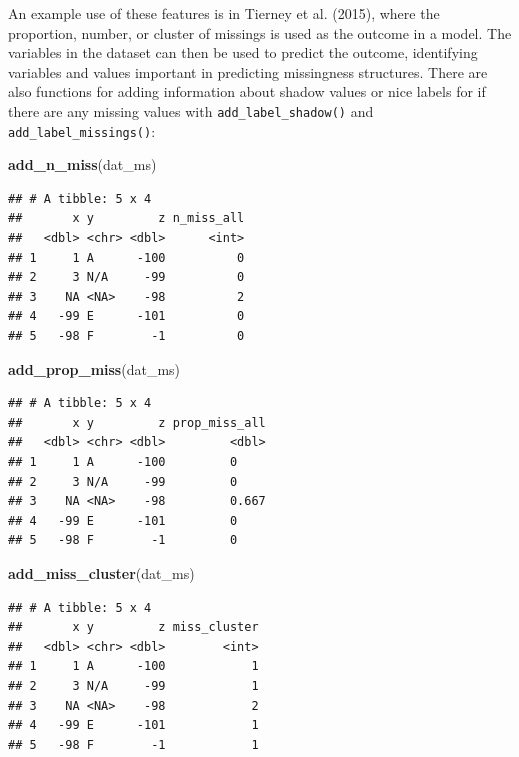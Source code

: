 \documentclass[]{article}
\newenvironment{Shaded}{\begin{snugshade}}{\end{snugshade}}
\newcommand{\KeywordTok}[1]{\textcolor[rgb]{0.13,0.29,0.53}{\textbf{#1}}}
\newcommand{\NormalTok}[1]{#1}
\theoremstyle{definition}
\theoremstyle{definition}
\theoremstyle{definition}
\theoremstyle{remark}
\begin{document}
An example use of these features is in Tierney et al. (2015), where the
proportion, number, or cluster of missings is used as the outcome in a
model. The variables in the dataset can then be used to predict the
outcome, identifying variables and values important in predicting
missingness structures. There are also functions for adding information
about shadow values or nice labels for if there are any missing values
with \texttt{add\_label\_shadow()} and \texttt{add\_label\_missings()}:

\begin{Shaded}
\begin{Highlighting}[]
\KeywordTok{add_n_miss}\NormalTok{(dat_ms)}
\end{Highlighting}
\end{Shaded}

\begin{verbatim}
## # A tibble: 5 x 4
##       x y         z n_miss_all
##   <dbl> <chr> <dbl>      <int>
## 1     1 A      -100          0
## 2     3 N/A     -99          0
## 3    NA <NA>    -98          2
## 4   -99 E      -101          0
## 5   -98 F        -1          0
\end{verbatim}

\begin{Shaded}
\begin{Highlighting}[]
\KeywordTok{add_prop_miss}\NormalTok{(dat_ms)}
\end{Highlighting}
\end{Shaded}

\begin{verbatim}
## # A tibble: 5 x 4
##       x y         z prop_miss_all
##   <dbl> <chr> <dbl>         <dbl>
## 1     1 A      -100         0    
## 2     3 N/A     -99         0    
## 3    NA <NA>    -98         0.667
## 4   -99 E      -101         0    
## 5   -98 F        -1         0
\end{verbatim}

\begin{Shaded}
\begin{Highlighting}[]
\KeywordTok{add_miss_cluster}\NormalTok{(dat_ms)}
\end{Highlighting}
\end{Shaded}

\begin{verbatim}
## # A tibble: 5 x 4
##       x y         z miss_cluster
##   <dbl> <chr> <dbl>        <int>
## 1     1 A      -100            1
## 2     3 N/A     -99            1
## 3    NA <NA>    -98            2
## 4   -99 E      -101            1
## 5   -98 F        -1            1
\end{verbatim}
\end{document}
